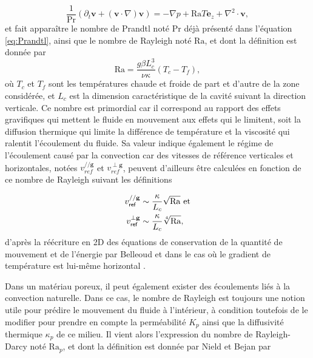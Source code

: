 \begin{equation}
	\frac{1}{\mathrm{Pr}}(\partial_t \mathbf{v} + (\mathbf{v} \cdot \nabla)\mathbf{v}) = -\nabla p + \mathrm{Ra} T \mathbf e_z + \nabla^2 \cdot \mathbf{v},
	\label{eq:NonDim_NavierStokes_Boussinesq_QtMvt}
\end{equation}
et fait apparaître le nombre de Prandtl noté $\mathrm{Pr}$ déjà présenté dans l'équation \eqref{eq:Prandtl}, ainsi que le nombre de Rayleigh noté $\mathrm{Ra}$, et dont la définition est donnée par 
\begin{equation}
	\mathrm{Ra} = \frac{g \beta L_c^3}{\nu \kappa} (T_c-T_f),
	\label{eq:NbrRayleigh}
\end{equation}
où $T_c$ et $T_f$ sont les températures chaude et froide de part et d'autre de la zone considérée, et $L_c$ est la dimension caractéristique de la cavité suivant la direction verticale. Ce nombre est primordial car il correspond au rapport des effets gravifiques qui mettent le fluide en mouvement aux effets qui le limitent, soit la diffusion thermique qui limite la différence de température et la viscosité qui ralentit l'écoulement du fluide. Sa valeur indique également le régime de l'écoulement causé par la convection car des vitesses de référence verticales et horizontales, notées $v_{ref}^{// \mathbf g}$ et $v_{ref}^{\perp \mathbf g}$, peuvent d'ailleurs être calculées en fonction de ce nombre de Rayleigh suivant les définitions

\begin{subequations}
	\begin{align}
		v_{\sf ref}^{// \mathbf g} &\sim \frac{\kappa}{L_c}\sqrt{\mathrm{Ra}} \text{ et}	\label{eq:VitesseReferenceV_Rayleigh}\\
		v_{\sf ref}^{\perp \mathbf g} &\sim \frac{\kappa}{L_c}\sqrt[4]{\mathrm{Ra}},	\label{eq:VitesseReferenceH_Rayleigh}
	\end{align}
	\label{eq:VitesseReference_Rayleigh}%
\end{subequations}
d'après la réécriture en 2D des équations de conservation de la quantité de mouvement et de l'énergie par Belleoud et dans le cas où le gradient de température est lui-même horizontal \cite{belleoud_etude_2016}. 

Dans un matériau poreux, il peut également exister des écoulements liés à la convection naturelle. Dans ce cas, le nombre de Rayleigh est toujours une notion utile pour prédire le mouvement du fluide à l'intérieur, à condition toutefois de le modifier pour prendre en compte la perméabilité $K_p$ ainsi que la diffusivité thermique $\kappa_p$ de ce milieu. Il vient alors l'expression du nombre de Rayleigh-Darcy noté $\mathrm{Ra}_p$, et dont la définition est donnée par Nield et Bejan \cite{nield_convection_2013} par

